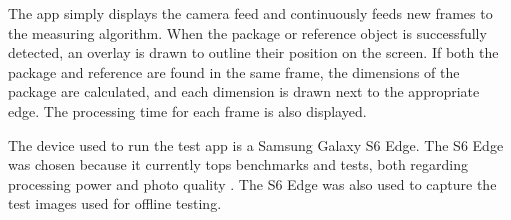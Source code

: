 The app simply displays the camera feed and continuously feeds new frames to the measuring algorithm.
When the package or reference object is successfully detected, an overlay is drawn to outline their position on the screen.
If both the package and reference are found in the same frame, the dimensions of the package are calculated, and each dimension is drawn next to the appropriate edge.
The processing time for each frame is also displayed.

The device used to run the test app is a Samsung Galaxy S6 Edge.
The S6 Edge was chosen because it currently tops benchmarks and tests, both regarding processing power and photo quality \cite{phone_performance_benchmark}\cite{phone_camera_benchmark}.
The S6 Edge was also used to capture the test images used for offline testing.










